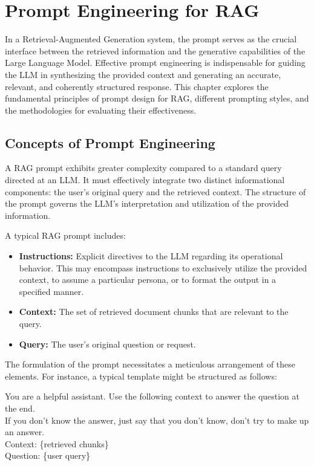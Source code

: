 \chapter{Prompt Engineering for RAG}
\label{chap:prompt_engineering}

In a Retrieval-Augmented Generation system, the prompt serves as the crucial interface between the retrieved information and the generative capabilities of the Large Language Model. Effective prompt engineering is indispensable for guiding the LLM in synthesizing the provided context and generating an accurate, relevant, and coherently structured response. This chapter explores the fundamental principles of prompt design for RAG, different prompting styles, and the methodologies for evaluating their effectiveness.

\section{Concepts of Prompt Engineering}
A RAG prompt exhibits greater complexity compared to a standard query directed at an LLM. It must effectively integrate two distinct informational components: the user's original query and the retrieved context. The structure of the prompt governs the LLM's interpretation and utilization of the provided information.

A typical RAG prompt includes:
\begin{itemize}
    \item \textbf{Instructions:} Explicit directives to the LLM regarding its operational behavior. This may encompass instructions to exclusively utilize the provided context, to assume a particular persona, or to format the output in a specified manner.
    \item \textbf{Context:} The set of retrieved document chunks that are relevant to the query.
    \item \textbf{Query:} The user's original question or request.
\end{itemize}

The formulation of the prompt necessitates a meticulous arrangement of these elements. For instance, a typical template might be structured as follows:

\begin{tcolorbox}[promptbox,title=Example: A Typical RAG prompt]
You are a helpful assistant. Use the following context to answer the question at the end.\\
If you don't know the answer, just say that you don't know, don't try to make up an answer.\\

Context: \{retrieved chunks\}\\

Question: \{user query\}
\end{tcolorbox}

